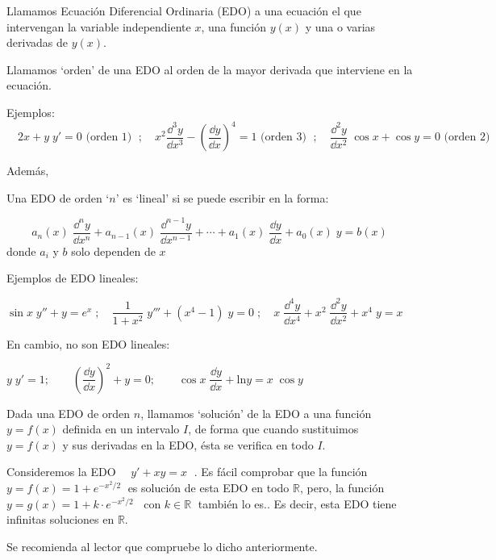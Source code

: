 \begin{defi}
Llamamos Ecuación Diferencial Ordinaria (EDO) a una ecuación el que intervengan la variable independiente $x$, una función $y(x)$ y una o varias derivadas de $y(x)$.	
\end{defi}

\begin{defi}
Llamamos `orden' de una EDO al orden de la mayor derivada que interviene en la ecuación. 
\end{defi}

Ejemplos: $\quad 2x+y\; y'=0 \text{ (orden 1) }\; ; \quad x^2 \dfrac {\dd^3 y}{\dd x^3}- \left( \dfrac {\dd y}{\dd x} \right)^4=1 \text{ (orden 3) }\; ; \quad  \dfrac {\dd^2 y}{\dd x^2}\; \cos x + \cos y =0 \text{ (orden 2) } $

Además,

\begin{defi}
Una EDO de orden `$n$' es `lineal' si se puede escribir en la forma:

\begin{equation}
	a_n(x)\; \dfrac {\dd^n y}{\dd x^n}+a_{n-1}(x)\; \dfrac {\dd^{n-1} y}{\dd x^{n-1}}+ \cdots + a_1(x)\;  \dfrac {\dd y}{\dd x}+a_0(x)\; y=b(x)
\end{equation}	
donde $a_i$ y $b$ solo dependen de $x$
\end{defi}

Ejemplos de EDO lineales:

$\sin x \; y''+y=e^x\; ; \quad \dfrac {1}{1+x^2}\; y'''+ (x^4-1)\; y=0\; ; \quad x\; \dfrac {\dd^4 y}{\dd x^4}+ x^2 \; \dfrac {\dd^2 y}{\dd x^2}+x^4\; y = x$

En cambio, no son EDO lineales:

$y\; y'=1;\qquad  \left( \dfrac{\dd y}{\dd x} \right)^2+y=0; \qquad \cos x\; \dfrac {\dd y}{\dd x}+\mathrm{ln} y=x\; \cos y$

\begin{defi}
Dada una EDO de orden $n$, llamamos `solución'	de la EDO a una función $y=f(x)$ definida en un intervalo $I$, de forma que cuando sustituimos $y=f(x)$ y sus derivadas en la EDO, ésta se verifica en todo $I$.
\end{defi}

\begin{ejem}
Consideremos la EDO $\quad y'+xy=x\; $	. Es fácil comprobar que la función $y=f(x)=1+e^{-{x^2}/2}\; $ es solución de esta EDO en todo $\mathbb R$, pero, la función $y=g(x)=1+k\cdot e^{-{x^2}/2}\; \; \text{ con } k\in \mathbb R \; $ también lo es.. Es decir, esta EDO tiene infinitas soluciones en $\mathbb R$.

Se recomienda al lector que compruebe lo dicho anteriormente.
\end{ejem}

